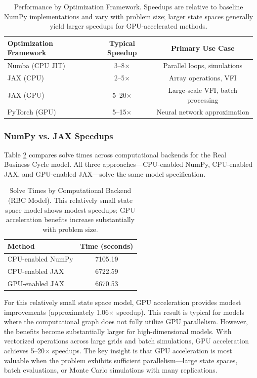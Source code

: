 \documentclass[12pt]{article}
\begin{document}
\begin{table}[H]
\centering
\begin{tabular}{lcc}
\toprule
Optimization Framework & Typical Speedup & Primary Use Case \\
\midrule
Numba (CPU JIT) & 3--8$\times$ & Parallel loops, simulations \\
JAX (CPU) & 2--5$\times$ & Array operations, VFI \\
JAX (GPU) & 5--20$\times$ & Large-scale VFI, batch processing \\
PyTorch (GPU) & 5--15$\times$ & Neural network approximation \\
\bottomrule
\end{tabular}
\caption{Performance by Optimization Framework. Speedups are relative to baseline NumPy implementations and vary with problem size; larger state spaces generally yield larger speedups for GPU-accelerated methods.}
\label{tab:optimization_frameworks}
\end{table}

\subsubsection{NumPy vs. JAX Speedups}

Table \ref{tab:speedups} compares solve times across computational backends for the Real Business Cycle model. All three approaches---CPU-enabled NumPy, CPU-enabled JAX, and GPU-enabled JAX---solve the same model specification.

\begin{table}[H]
\centering
\begin{tabular}{lc}
\toprule
Method & Time (seconds) \\
\midrule
CPU-enabled NumPy & 7105.19 \\
CPU-enabled JAX & 6722.59 \\
GPU-enabled JAX & 6670.53 \\
\bottomrule
\end{tabular}
\caption{Solve Times by Computational Backend (RBC Model). This relatively small state space model shows modest speedups; GPU acceleration benefits increase substantially with problem size.}
\label{tab:speedups}
\end{table}

For this relatively small state space model, GPU acceleration provides modest improvements (approximately 1.06$\times$ speedup). This result is typical for models where the computational graph does not fully utilize GPU parallelism. However, the benefits become substantially larger for high-dimensional models. With vectorized operations across large grids and batch simulations, GPU acceleration achieves 5--20$\times$ speedups. The key insight is that GPU acceleration is most valuable when the problem exhibits sufficient parallelism---large state spaces, batch evaluations, or Monte Carlo simulations with many replications.
\end{document}
